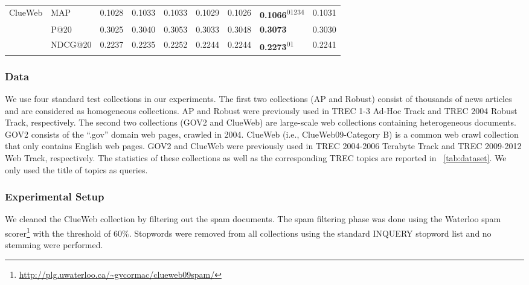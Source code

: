 \documentclass[sigconf]{acmart}
\begin{document}
\begin{table*}[t]
\begin{tabular}{|c|l|c|c|c|c|c||l|l|}
\multirow{3}{*}{ClueWeb}
& MAP     & 0.1028 & 0.1033 & 0.1033 & 0.1029 & 0.1026 & \textbf{0.1066}\textsuperscript{01234} & 0.1031 {\rule{0pt}{2.6ex}}\\
& P@20    & 0.3025 & 0.3040 & 0.3053 & 0.3033 & 0.3048 & \textbf{0.3073} & 0.3030 \\
& NDCG@20 & 0.2237 & 0.2235 & 0.2252 & 0.2244 & 0.2244 & \textbf{0.2273}\textsuperscript{01} & 0.2241 \\
\hline

\end{tabular}
\label{tab:main}
\vspace{-0.2cm}
\end{table*}

\subsubsection{Data}
We use four standard test collections in our experiments. The first two collections (AP and Robust) consist of thousands of news articles and are considered as homogeneous collections. AP and Robust were previously used in TREC 1-3 Ad-Hoc Track and TREC 2004 Robust Track, respectively. The second two collections (GOV2 and ClueWeb) are large-scale web collections containing heterogeneous documents. GOV2 consists of the ``.gov'' domain web pages, crawled in 2004. ClueWeb (i.e., ClueWeb09-Category B) is a common web crawl collection that only contains English web pages. GOV2 and ClueWeb were previously used in TREC 2004-2006 Terabyte Track and TREC 2009-2012 Web Track, respectively. The statistics of these collections as well as the corresponding TREC topics are reported in \tablename~\ref{tab:dataset}. We only used the title of topics as queries.

\subsubsection{Experimental Setup}
We cleaned the ClueWeb collection by filtering out the spam documents. The spam filtering phase was done using the Waterloo spam scorer\footnote{\url{http://plg.uwaterloo.ca/~gvcormac/clueweb09spam/}} \cite{Cormack:2011} with the threshold of $60\%$. Stopwords were removed from all collections using the standard INQUERY stopword list and no stemming were performed.
\end{document}
